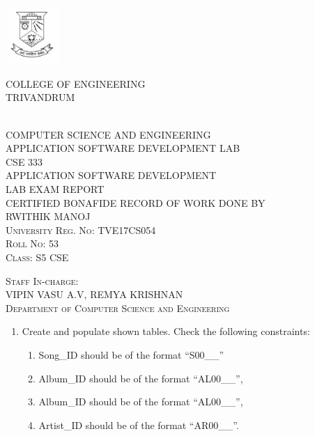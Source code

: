 \documentclass[
]{article}
\date{}
\providecommand{\tightlist}{%
  \setlength{\itemsep}{0pt}\setlength{\parskip}{0pt}}
\begin{document}
\begin{titlepage}
\vfill
\begin{center}
\includegraphics[width=2cm]{../Images/index.jpeg}
\\[1cm]
\begin{LARGE}
\uppercase{College of Engineering}
\\[0.3cm]
\uppercase{Trivandrum}
\end{LARGE}
\\[1.5cm]
\uppercase{Computer science and engineering}
\\[0.2cm]
\uppercase{Application software development lab}
\\[0.5cm]
{\Large CSE 333}
\\[1cm]
{\Large\uppercase{Application software development\\[0.1cm]lab exam report}}
\\[0.5cm]
\uppercase{Certified bonafide record of work done by}
\\[0.5cm]
\uppercase{Rwithik Manoj}
\\[0.4cm]
\textsc{University Reg. No: TVE17CS054}
\\[0.4cm]
\textsc{Roll No: 53}
\\[0.4cm]
\textsc{Class: S5 CSE}
\end{center}
\vfill
\textsc{Staff In-charge:}\\[0.4cm]
VIPIN VASU A.V, REMYA KRISHNAN\\[0.4cm]
\textsc{Department of Computer Science and Engineering}
\end{titlepage}

\begin{enumerate}
\def\labelenumi{\arabic{enumi}.}
\tightlist
\item
  Create and populate shown tables. Check the following constraints:

  \begin{enumerate}
  \def\labelenumii{\arabic{enumii}.}
  \tightlist
  \item
    Song\_ID should be of the format ``S00\_\_''
  \item
    Album\_ID should be of the format ``AL00\_\_'',
  \item
    Album\_ID should be of the format ``AL00\_\_'',
  \item
    Artist\_ID should be of the format ``AR00\_\_''.
  \end{enumerate}
\end{enumerate}
\end{document}
